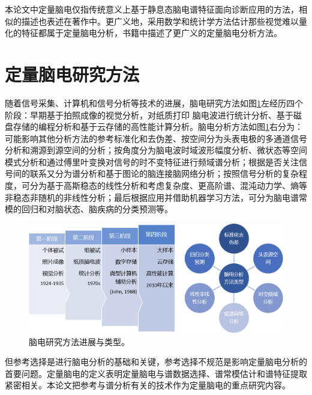 本论文中定量脑电仅指传统意义上基于静息态脑电谱特征面向诊断应用的方法，相似的描述也表述在著作中。更广义地，采用数学和统计学方法估计那些视觉难以量化的特征都属于定量脑电分析，书籍中描述了更广义的定量脑电分析方法。

\section{定量脑电研究方法}
随着信号采集、计算机和信号分析等技术的进展，脑电研究方法如图\ref{1:evol}左经历四个阶段：早期基于拍照成像的视觉分析，对纸质打印
脑电波进行统计分析、基于磁盘存储的编程分析和基于云存储的高性能计算分析。脑电分析方法如图\ref{1:evol}右分为：可能影响其他分析方法的参考标准化和去伪差、按空间分为头表电极的多通道信号分析和溯源到源空间的分析；按角度分为脑电波时域波形幅度分析、微状态等空间模式分析和通过傅里叶变换对信号的时不变特征进行频域谱分析；根据是否关注信号间的联系又分为谱分析和基于图论的脑连接脑网络分析；按照信号分析的复杂程度，可分为基于高斯稳态的线性分析和考虑复杂度、更高阶谱、混沌动力学、熵等非稳态非随机的非线性分析；最后根据应用并借助机器学习方法，可分为脑电谱常模的回归和对脑状态、脑疾病的分类预测等。
\begin{figure}[!h]
	\includegraphics[width=15cm]{pic/xulun/evolution.png}
	\caption{脑电研究方法进展与类型。}
	\label{1:evol}
\end{figure}

但参考选择是进行脑电分析的基础和关键，参考选择不规范是影响定量脑电分析的首要问题。定量脑电的定义表明定量脑电与谱数据选择、谱常模估计和谱特征提取紧密相关。本论文把参考与谱分析有关的技术作为定量脑电的重点研究内容。

